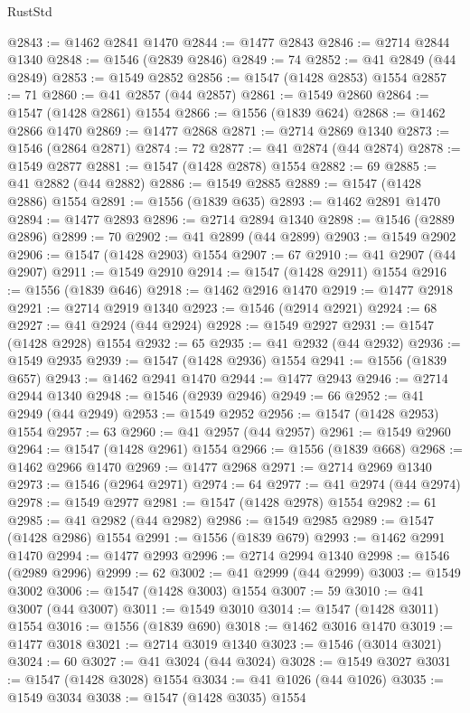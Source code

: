 \begin{lexlean}{RustStd}
\begin{coremodule}
@2843 := @1462 @2841 @1470
@2844 := @1477 @2843
@2846 := @2714 @2844 @1340
@2848 := @1546 (@2839 @2846)
@2849 := 74
@2852 := @41 @2849 (@44 @2849)
@2853 := @1549 @2852
@2856 := @1547 (@1428 @2853) @1554
@2857 := 71
@2860 := @41 @2857 (@44 @2857)
@2861 := @1549 @2860
@2864 := @1547 (@1428 @2861) @1554
@2866 := @1556 (@1839 @624)
@2868 := @1462 @2866 @1470
@2869 := @1477 @2868
@2871 := @2714 @2869 @1340
@2873 := @1546 (@2864 @2871)
@2874 := 72
@2877 := @41 @2874 (@44 @2874)
@2878 := @1549 @2877
@2881 := @1547 (@1428 @2878) @1554
@2882 := 69
@2885 := @41 @2882 (@44 @2882)
@2886 := @1549 @2885
@2889 := @1547 (@1428 @2886) @1554
@2891 := @1556 (@1839 @635)
@2893 := @1462 @2891 @1470
@2894 := @1477 @2893
@2896 := @2714 @2894 @1340
@2898 := @1546 (@2889 @2896)
@2899 := 70
@2902 := @41 @2899 (@44 @2899)
@2903 := @1549 @2902
@2906 := @1547 (@1428 @2903) @1554
@2907 := 67
@2910 := @41 @2907 (@44 @2907)
@2911 := @1549 @2910
@2914 := @1547 (@1428 @2911) @1554
@2916 := @1556 (@1839 @646)
@2918 := @1462 @2916 @1470
@2919 := @1477 @2918
@2921 := @2714 @2919 @1340
@2923 := @1546 (@2914 @2921)
@2924 := 68
@2927 := @41 @2924 (@44 @2924)
@2928 := @1549 @2927
@2931 := @1547 (@1428 @2928) @1554
@2932 := 65
@2935 := @41 @2932 (@44 @2932)
@2936 := @1549 @2935
@2939 := @1547 (@1428 @2936) @1554
@2941 := @1556 (@1839 @657)
@2943 := @1462 @2941 @1470
@2944 := @1477 @2943
@2946 := @2714 @2944 @1340
@2948 := @1546 (@2939 @2946)
@2949 := 66
@2952 := @41 @2949 (@44 @2949)
@2953 := @1549 @2952
@2956 := @1547 (@1428 @2953) @1554
@2957 := 63
@2960 := @41 @2957 (@44 @2957)
@2961 := @1549 @2960
@2964 := @1547 (@1428 @2961) @1554
@2966 := @1556 (@1839 @668)
@2968 := @1462 @2966 @1470
@2969 := @1477 @2968
@2971 := @2714 @2969 @1340
@2973 := @1546 (@2964 @2971)
@2974 := 64
@2977 := @41 @2974 (@44 @2974)
@2978 := @1549 @2977
@2981 := @1547 (@1428 @2978) @1554
@2982 := 61
@2985 := @41 @2982 (@44 @2982)
@2986 := @1549 @2985
@2989 := @1547 (@1428 @2986) @1554
@2991 := @1556 (@1839 @679)
@2993 := @1462 @2991 @1470
@2994 := @1477 @2993
@2996 := @2714 @2994 @1340
@2998 := @1546 (@2989 @2996)
@2999 := 62
@3002 := @41 @2999 (@44 @2999)
@3003 := @1549 @3002
@3006 := @1547 (@1428 @3003) @1554
@3007 := 59
@3010 := @41 @3007 (@44 @3007)
@3011 := @1549 @3010
@3014 := @1547 (@1428 @3011) @1554
@3016 := @1556 (@1839 @690)
@3018 := @1462 @3016 @1470
@3019 := @1477 @3018
@3021 := @2714 @3019 @1340
@3023 := @1546 (@3014 @3021)
@3024 := 60
@3027 := @41 @3024 (@44 @3024)
@3028 := @1549 @3027
@3031 := @1547 (@1428 @3028) @1554
@3034 := @41 @1026 (@44 @1026)
@3035 := @1549 @3034
@3038 := @1547 (@1428 @3035) @1554

\end{coremodule}
\end{lexlean}
